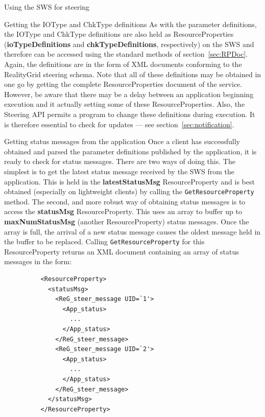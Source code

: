 \documentclass[a4paper]{article}
\begin{document}
\begin{section}{Using the SWS for steering}
\begin{subsection}{Getting the IOType and ChkType definitions}
As with the parameter definitions, the IOType and ChkType definitions
are also held as ResourceProperties ({\bf ioTypeDefinitions} and {\bf
chkTypeDefinitions}, respectively) on the SWS and therefore can be
accessed using the standard methods of section~\ref{sec:RPDoc}.
Again, the definitions are in the form of XML documents conforming to
the RealityGrid steering schema.  Note that all of these definitions
may be obtained in one go by getting the complete ResourceProperties
document of the service.  However, be aware that there may be a delay
between an application beginning execution and it actually setting
some of these ResourceProperties. Also, the Steering API permits a
program to change these definitions during execution.  It is therefore
essential to check for updates --- see section~\ref{sec:notification}.
\end{subsection}

\begin{subsection}{Getting status messages from the application}
Once a client has successfully obtained and parsed the parameter
definitions published by the application, it is ready to check for
status messages.  There are two ways of doing this.  The simplest is
to get the latest status message received by the SWS from the
application.  This is held in the {\bf latestStatusMsg} ResourceProperty and
is best obtained (especially on lightweight clients) by calling the
\texttt{GetResourceProperty} method.  The second, and more robust way of
obtaining status messages is to access the {\bf statusMsg} ResourceProperty.
This uses an array to buffer up to {\bf maxNumStatusMsg} (another
ResourceProperty) status messages.  Once the array is full, the
arrival of a new status message causes the oldest message held in the
buffer to be replaced.  Calling \texttt{GetResourceProperty} for this
ResourceProperty returns an XML document containing an array of status
messages in the form:
\begin{verbatim}
          <ResourceProperty>
            <statusMsg>
              <ReG_steer_message UID=`1'>
                <App_status>
                  ...
                </App_status>
              </ReG_steer_message>
              <ReG_steer_message UID=`2'>
                <App_status>
                  ...
                </App_status>
              </ReG_steer_message>
            </statusMsg>
          </ResourceProperty>
\end{verbatim}


\end{subsection}
\end{section}
\end{document}
